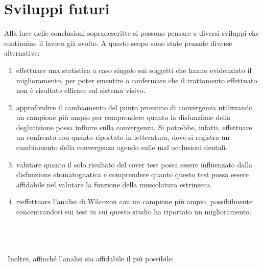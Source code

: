 \section{Sviluppi futuri}

Alla luce delle conclusioni sopradescritte si possono pensare a diversi sviluppi che continuino il lavoro già svolto. A questo scopo sono state pensate diverse alternative:
\begin{enumerate}
\item effettuare una statistica a caso singolo sui soggetti che hanno evidenziato il miglioramento, per poter smentire o confermare che il trattamento effettuato non è risultato efficace sul sistema visivo.
\item approfondire il cambiamento del punto prossimo di convergenza utilizzando un campione più ampio per comprendere quanto la disfunzione della deglutizione possa influire sulla convergenza. Si potrebbe, infatti, effettuare un confronto con quanto riportato in letteratura, dove si registra un cambiamento della convergenza agendo sulle mal occlusioni dentali.
\item valutare quanto il solo risultato del cover test possa essere influenzato dalla disfunzione stomatognatica e comprendere quanto questo test possa essere affidabile nel valutare la funzione della muscolatura estrinseca.
\item rieffettuare l’analisi di Wilcoxon con un campione più ampio, possibilmente concentrandosi sui test in cui questo studio ha riportato un miglioramento.
\end{enumerate}
\\\ \\\ \\\
Inoltre, affinché l’analisi sia affidabile il più possibile:
